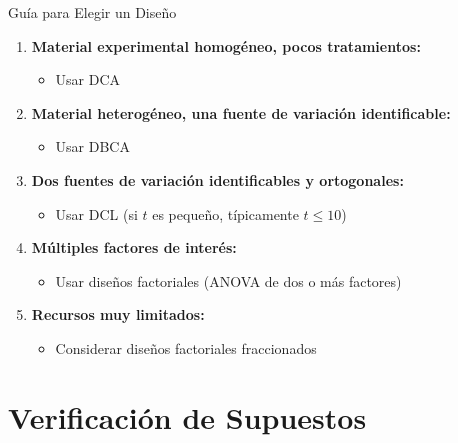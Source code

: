 \documentclass[aspectratio=169]{beamer}
\begin{document}
\begin{frame}{Guía para Elegir un Diseño}
\begin{enumerate}
\item \textbf{Material experimental homogéneo, pocos tratamientos:}
\begin{itemize}
\item Usar DCA
\end{itemize}

\vspace{0.2cm}

\item \textbf{Material heterogéneo, una fuente de variación identificable:}
\begin{itemize}
\item Usar DBCA
\end{itemize}

\vspace{0.2cm}

\item \textbf{Dos fuentes de variación identificables y ortogonales:}
\begin{itemize}
\item Usar DCL (si $t$ es pequeño, típicamente $t \leq 10$)
\end{itemize}

\vspace{0.2cm}

\item \textbf{Múltiples factores de interés:}
\begin{itemize}
\item Usar diseños factoriales (ANOVA de dos o más factores)
\end{itemize}

\vspace{0.2cm}

\item \textbf{Recursos muy limitados:}
\begin{itemize}
\item Considerar diseños factoriales fraccionados
\end{itemize}
\end{enumerate}
\end{frame}

\section{Verificación de Supuestos}
\end{document}
